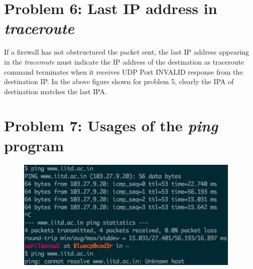 \documentclass[]{report}
\begin{document}
\section{Problem 6: Last IP address in \textit{traceroute}}
If a firewall has not obstructured the packet sent, the last IP address appearing in the \textit{traceroute} must indicate the IP address of the destination as traceroute command terminates when it receives UDP Port INVALID response from the destination IP. In the above figure shown for problem 5, clearly the IPA of destination matches the last IPA.

\section{Problem 7: Usages of the \textit{ping} program}
\begin{figure}[H]
	\vspace{0pt}
	\includegraphics[height = 150pt, keepaspectratio]{Snapshots/exe7/q7_1.png}
\end{figure} 
\end{document}
